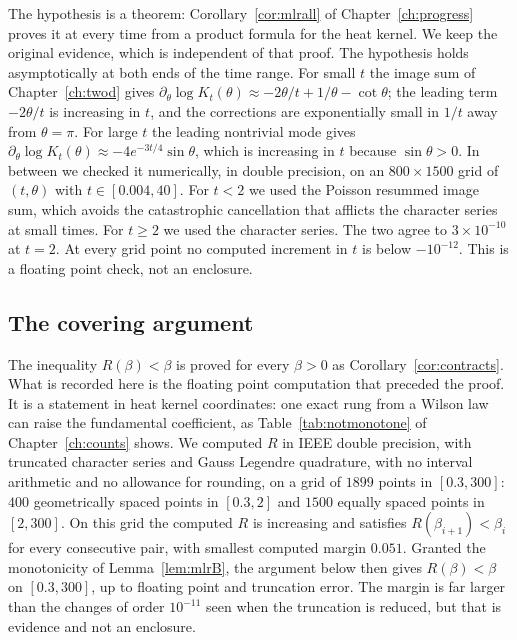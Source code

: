 The hypothesis is a theorem: Corollary~\ref{cor:mlrall} of Chapter~\ref{ch:progress} proves it at every time from a product formula for the heat kernel. We keep the original evidence, which is independent of that proof. The hypothesis holds asymptotically at both ends of the time range. For small $t$ the image sum of Chapter~\ref{ch:twod} gives $\partial_\theta\log K_t(\theta)\approx-2\theta/t+1/\theta-\cot\theta$; the leading term $-2\theta/t$ is increasing in $t$, and the corrections are exponentially small in $1/t$ away from $\theta=\pi$. For large $t$ the leading nontrivial mode gives $\partial_\theta\log K_t(\theta)\approx-4e^{-3t/4}\sin\theta$, which is increasing in $t$ because $\sin\theta>0$. In between we checked it numerically, in double precision, on an $800\times1500$ grid of $(t,\theta)$ with $t\in[0.004,40]$. For $t<2$ we used the Poisson resummed image sum, which avoids the catastrophic cancellation that afflicts the character series at small times. For $t\ge2$ we used the character series. The two agree to $3\times10^{-10}$ at $t=2$. At every grid point no computed increment in $t$ is below $-10^{-12}$. This is a floating point check, not an enclosure.

\subsection{The covering argument}

\begin{remark}\label{prop:coverB}
The inequality $R(\beta)<\beta$ is proved for every $\beta>0$ as Corollary~\ref{cor:contracts}. What is recorded here is the floating point computation that preceded the proof. It is a statement in heat kernel coordinates: one exact rung from a Wilson law can raise the fundamental coefficient, as Table~\ref{tab:notmonotone} of Chapter~\ref{ch:counts} shows. We computed $R$ in IEEE double precision, with truncated character series and Gauss Legendre quadrature, with no interval arithmetic and no allowance for rounding, on a grid of $1899$ points in $[0.3,300]$: $400$ geometrically spaced points in $[0.3,2]$ and $1500$ equally spaced points in $[2,300]$. On this grid the computed $R$ is increasing and satisfies $R(\beta_{i+1})<\beta_i$ for every consecutive pair, with smallest computed margin $0.051$. Granted the monotonicity of Lemma~\ref{lem:mlrB}, the argument below then gives $R(\beta)<\beta$ on $[0.3,300]$, up to floating point and truncation error. The margin is far larger than the changes of order $10^{-11}$ seen when the truncation is reduced, but that is evidence and not an enclosure.
\end{remark}

